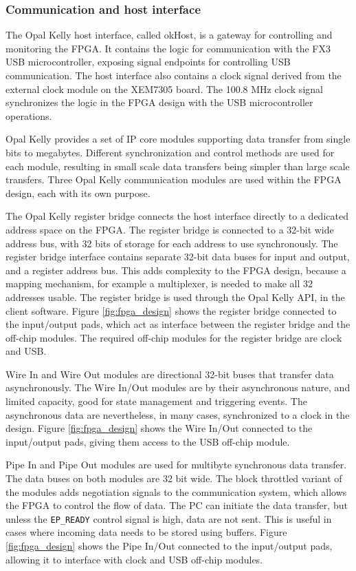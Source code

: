 \documentclass[12pt]{report}
\begin{document}
\subsubsection{Communication and host interface}
The Opal Kelly host interface, called okHost, is a gateway for controlling and monitoring the FPGA. It contains the logic for communication with the FX3 USB microcontroller, exposing signal endpoints for controlling USB communication. The host interface also contains a clock signal derived from the external clock module on the XEM7305 board. The 100.8 MHz clock signal synchronizes the logic in the FPGA design with the USB microcontroller operations. \citep{XEM7305Man} \citep{FrontPanelMan} \citep{stpp}
\par
Opal Kelly provides a set of IP core modules supporting data transfer from single bits to megabytes. Different synchronization and control methods are used for each module, resulting in small scale data transfers being simpler than large scale transfers. Three Opal Kelly communication modules are used within the FPGA design, each with its own purpose.
\par
The Opal Kelly register bridge connects the host interface directly to a dedicated address space on the FPGA. The register bridge is connected to a 32-bit wide address bus, with 32 bits of storage for each address to use synchronously. The register bridge interface contains separate 32-bit data buses for input and output, and a register address bus. This adds complexity to the FPGA design, because a mapping mechanism, for example a multiplexer, is needed to make all 32 addresses usable. The register bridge is used through the Opal Kelly API, in the client software. Figure \ref*{fig:fpga_design} shows the register bridge connected to the input/output pads, which act as interface between the register bridge and the off-chip modules. The required off-chip modules for the register bridge are clock and USB. \citep{FrontPanelMan} \citep{stpp}
\par
Wire In and Wire Out modules are directional 32-bit buses that transfer data asynchronously. The Wire In/Out modules are by their asynchronous nature, and limited capacity, good for state management and triggering events. The asynchronous data are nevertheless, in many cases, synchronized to a clock in the design. Figure \ref*{fig:fpga_design} shows the Wire In/Out connected to the input/output pads, giving them access to the USB off-chip module. \citep{FrontPanelMan} \citep{stpp}
\par
Pipe In and Pipe Out modules are used for multibyte synchronous data transfer. The data buses on both modules are 32 bit wide. The block throttled variant of the modules adds negotiation signals to the communication system, which allows the FPGA to control the flow of data. The PC can initiate the data transfer, but unless the \verb|EP_READY| control signal is high, data are not sent. This is useful in cases where incoming data needs to be stored using buffers. Figure \ref*{fig:fpga_design} shows the Pipe In/Out connected to the input/output pads, allowing it to interface with clock and USB off-chip modules. \citep{FrontPanelMan} \citep{stpp}
\end{document}
